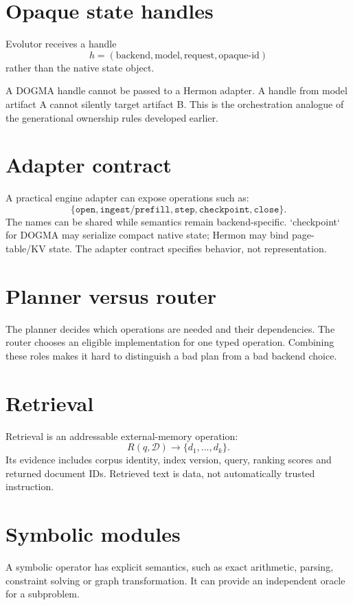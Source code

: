 \section{Opaque state handles}
Evolutor receives a handle
\[
h=(\text{backend},\text{model},\text{request},\text{opaque-id})
\]
rather than the native state object.

A DOGMA handle cannot be passed to a Hermon adapter. A handle from model artifact A cannot silently target artifact B. This is the orchestration analogue of the generational ownership rules developed earlier.

\section{Adapter contract}
A practical engine adapter can expose operations such as:
\[
\{\texttt{open},\texttt{ingest/prefill},\texttt{step},\texttt{checkpoint},\texttt{close}\}.
\]
The names can be shared while semantics remain backend-specific. `checkpoint` for DOGMA may serialize compact native state; Hermon may bind page-table/KV state. The adapter contract specifies behavior, not representation.

\section{Planner versus router}
The planner decides which operations are needed and their dependencies. The router chooses an eligible implementation for one typed operation. Combining these roles makes it hard to distinguish a bad plan from a bad backend choice.

\section{Retrieval}
Retrieval is an addressable external-memory operation:
\[
R(q,\mathcal D)\rightarrow \{d_1,\ldots,d_k\}.
\]
Its evidence includes corpus identity, index version, query, ranking scores and returned document IDs. Retrieved text is data, not automatically trusted instruction.

\section{Symbolic modules}
A symbolic operator has explicit semantics, such as exact arithmetic, parsing, constraint solving or graph transformation. It can provide an independent oracle for a subproblem.

